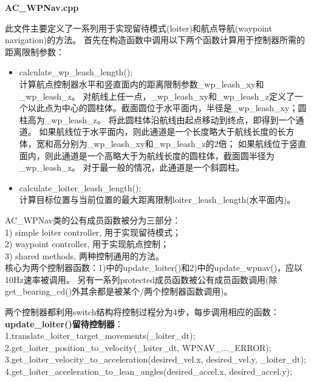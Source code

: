 \documentclass[a4paper,10pt]{ctexart} %
\begin{document}
\begin{center}
\textbf{AC\_WPNav.cpp}
\end{center}

此文件主要定义了一系列用于实现留待模式(loiter)和航点导航(waypoint navigation)的方法。
首先在构造函数中调用以下两个函数计算用于控制器所需的距离限制参数：
\begin{itemize}
\item calculate\_wp\_leash\_length();\\
计算航点控制器水平和竖直面内的距离限制参数\_wp\_leash\_xy和\_wp\_leash\_z。
对航线上任一点，\_wp\_leash\_xy和\_wp\_leash\_z定义了一个以此点为中心的圆柱体。截面圆位于水平面内，半径是\_wp\_leash\_xy；圆柱高为\_wp\_leash\_z。
将此圆柱体沿航线由起点移动到终点，即得到一个通道。
如果航线位于水平面内，则此通道是一个长度略大于航线长度的长方体，宽和高分别为\_wp\_leash\_xy和\_wp\_leash\_z的2倍；
如果航线位于竖直面内，则此通道是一个高略大于为航线长度的圆柱体，截面圆半径为\_wp\_leash\_z。
对于最一般的情况，此通道是一个斜圆柱。
\item calculate\_loiter\_leash\_length();\\
计算目标位置与当前位置的最大距离限制loiter\_leash\_length(水平面内)。
\end{itemize}

AC\_WPNav类的公有成员函数被分为三部分：\\
1) simple loiter controller, 用于实现留待模式；\\
2) waypoint controller, 用于实现航点控制；\\
3) shared methods, 两种控制通用的方法。\\
核心为两个控制器函数：1)中的update\_loiter()和2)中的update\_wpnav()，应以10Hz速率被调用。
另有一系列protected成员函数被公有成员函数调用(除get\_bearing\_cd()外其余都是被某个/两个控制器函数调用)。

两个控制器都利用switch结构将控制过程分为4步，每步调用相应的函数：\\
\textbf{update\_loiter()留待控制器}：\\
1.translate\_loiter\_target\_movements(\_loiter\_dt);\\
2.get\_loiter\_position\_to\_velocity(\_loiter\_dt, WPNAV\_...\_ERROR);\\
3.get\_loiter\_velocity\_to\_acceleration(desired\_vel.x, desired\_vel.y, \_loiter\_dt);\\
4.get\_loiter\_acceleration\_to\_lean\_angles(desired\_accel.x, desired\_accel.y);
\end{document}
